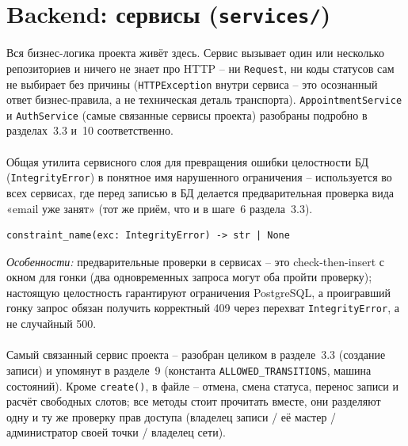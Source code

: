 \section{Backend: сервисы (\texttt{services/})}

Вся бизнес-логика проекта живёт здесь. Сервис вызывает один или
несколько репозиториев и ничего не знает про HTTP -- ни \texttt{Request},
ни коды статусов сам не выбирает без причины (\texttt{HTTPException}
внутри сервиса -- это осознанный ответ бизнес-правила, а не техническая
деталь транспорта). \texttt{AppointmentService} и \texttt{AuthService}
(самые связанные сервисы проекта) разобраны подробно в разделах~3.3 и~10
соответственно.

\paragraph{}
Общая утилита сервисного слоя для превращения ошибки целостности БД
(\texttt{IntegrityError}) в понятное имя нарушенного ограничения --
используется во всех сервисах, где перед записью в БД делается
предварительная проверка вида «email уже занят» (тот же приём, что и в
шаге~6 раздела~3.3).
\begin{verbatim}
constraint_name(exc: IntegrityError) -> str | None
\end{verbatim}
\textit{Особенности:} предварительные проверки в сервисах -- это
check-then-insert с окном для гонки (два одновременных запроса могут оба
пройти проверку); настоящую целостность гарантируют ограничения
PostgreSQL, а проигравший гонку запрос обязан получить корректный 409
через перехват \texttt{IntegrityError}, а не случайный 500.

\paragraph{}
Самый связанный сервис проекта -- разобран целиком в разделе~3.3
(создание записи) и упомянут в разделе~9 (константа
\texttt{ALLOWED_TRANSITIONS}, машина состояний). Кроме \texttt{create()},
в файле -- отмена, смена статуса, перенос записи и расчёт свободных
слотов; все методы стоит прочитать вместе, они разделяют одну и ту же
проверку прав доступа (владелец записи / её мастер / администратор своей
точки / владелец сети).

